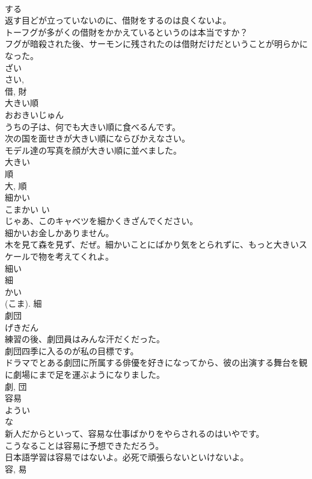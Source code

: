 \documentclass[8pt]{extreport}
\begin{document}
\begin{CJK}{UTF8}{min}
\\	する 
\\	返す目どが立っていないのに、借財をするのは良くないよ。	
\\	トーフグが多がくの借財をかかえているというのは本当ですか？	
\\	フグが暗殺された後、サーモンに残されたのは借財だけだということが明らかになった。	
\\	ざい 
\\	さい, 
\\	借, 財	
\\	大きい順	
\\	おおきいじゅん	
\\	うちの子は、何でも大きい順に食べるんです。	
\\	次の国を面せきが大きい順にならびかえなさい。	
\\	モデル達の写真を顔が大きい順に並べました。	
\\	大きい 
\\	順
\\	大, 順	
\\	細かい	
\\	こまかい	い 
\\	じゃあ、このキャベツを細かくきざんでください。	
\\	細かいお金しかありません。	
\\	木を見て森を見ず、だぜ。細かいことにばかり気をとられずに、もっと大きいスケールで物を考えてくれよ。	
\\	細い 
\\	細 
\\	かい 
\\	(こま).	細	
\\	劇団	
\\	げきだん	
\\	練習の後、劇団員はみんな汗だくだった。	
\\	劇団四季に入るのが私の目標です。	
\\	ドラマでとある劇団に所属する俳優を好きになってから、彼の出演する舞台を観に劇場にまで足を運ぶようになりました。	
\\	劇, 団	
\\	容易	
\\	ようい	
\\	な 
\\	新人だからといって、容易な仕事ばかりをやらされるのはいやです。	
\\	こうなることは容易に予想できただろう。	
\\	日本語学習は容易ではないよ。必死で頑張らないといけないよ。	
\\	容, 易	

\end{CJK}
\end{document}
